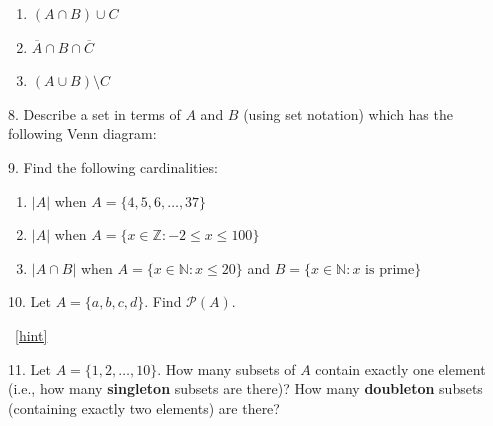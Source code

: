 \documentclass[10pt,]{book}
\newcommand{\terminology}[1]{\textbf{#1}}
\theoremstyle{plain}
\theoremstyle{definition}
\theoremstyle{definition}
\theoremstyle{definition}
\numberwithin{equation}{chapter}
\def\N{\mathbb N}
\def\Z{\mathbb Z}
\def\pow{\mathcal P}
\def\st{:}
\begin{document}
\begin{exerciselist}
\begin{enumerate}[label=(\alph*)]
\item\hypertarget{li-344}{}\((A \cap B) \cup C\)%
\item\hypertarget{li-345}{}\(\overline A \cap B \cap \overline C\)%
\item\hypertarget{li-346}{}\((A \cup B) \setminus C\)%
\end{enumerate}
%
\par\smallskip
\item[8.]\hypertarget{exercise-73}{}\hypertarget{p-2066}{}%
Describe a set in terms of \(A\) and \(B\) (using set notation) which has the following Venn diagram:%
\begin{sidebyside}{1}{0.4}{0.4}{0}
\begin{sbspanel}{0.2}
\end{sbspanel}
\end{sidebyside}
\par\smallskip
\item[9.]\hypertarget{exercise-74}{}\hypertarget{p-2067}{}%
Find the following cardinalities: \leavevmode%
\begin{enumerate}[label=(\alph*)]
\item\hypertarget{li-353}{}\(|A|\) when \(A = \{4,5,6,\ldots,37\}\)%
\item\hypertarget{li-354}{}\(|A|\) when \(A = \{x \in \Z \st -2 \le x \le 100\}\)%
\item\hypertarget{li-355}{}\(|A \cap B|\) when \(A = \{x \in \N \st x \le 20\}\) and \(B = \{x \in \N \st x \mbox{ is prime} \}\)%
\end{enumerate}
%
\par\smallskip
\item[10.]\hypertarget{exercise-75}{}\hypertarget{p-2072}{}%
Let \(A = \{a, b, c, d\}\). Find \(\pow(A)\).%
\par\smallskip
~\hfill{\tiny\hyperlink{a-B.2.10}{[hint]}\hypertarget{q-B.2.10}{}}\item[11.]\hypertarget{exercise-76}{}\hypertarget{p-2074}{}%
Let \(A = \{1,2,\ldots, 10\}\). How many subsets of \(A\) contain exactly one element (i.e., how many \terminology{singleton} subsets are there)? How many \terminology{doubleton} subsets (containing exactly two elements) are there?%

\end{exerciselist}
\end{document}
